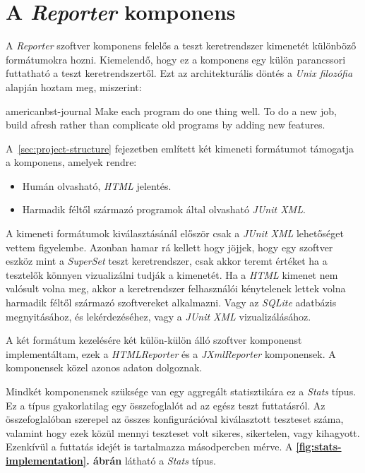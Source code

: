\section{A \textit{Reporter} komponens}\label{chp:reporter}

    A \textit{Reporter} szoftver komponens felelős a teszt keretrendszer kimenetét különböző formátumokra hozni.
    Kiemelendő, hogy ez a komponens egy külön parancssori futtatható a teszt keretrendszertől. Ezt az architekturális
    döntés a \emph{Unix filozófia} alapján hoztam meg, miszerint:

    \begin{foreigndisplaycquote}{american}{bst-journal}
        Make each program do one thing well. To do a new job, build afresh rather than complicate old programs by adding
        new features.
    \end{foreigndisplaycquote}

    A~\ref{sec:project-structure} fejezetben említett két kimeneti formátumot támogatja a komponens, amelyek rendre:

    \begin{itemize}
        \item Humán olvasható, \textit{HTML} jelentés.
        \item Harmadik féltől származó programok által olvasható \textit{JUnit XML}.
    \end{itemize}

    A kimeneti formátumok kiválasztásánál először csak a \textit{JUnit XML} lehetőséget vettem figyelembe. Azonban
    hamar rá kellett hogy jöjjek, hogy egy szoftver eszköz mint a \textit{SuperSet} teszt keretrendszer, csak akkor
    teremt értéket ha a tesztelők könnyen vizualizálni tudják a kimenetét. Ha a \textit{HTML} kimenet nem valósult
    volna meg, akkor a keretrendszer felhasználói kénytelenek lettek volna harmadik féltől származó szoftvereket
    alkalmazni. Vagy az \textit{SQLite} adatbázis megnyitásához, és lekérdezéséhez, vagy a \textit{JUnit XML}
    vizualizálásához.

    A két formátum kezelésére két külön-külön álló szoftver komponenst implementáltam, ezek a \textit{HTMLReporter} és
    a \textit{JXmlReporter} komponensek. A komponensek közel azonos adaton dolgoznak.

    Mindkét komponensnek szüksége van egy aggregált statisztikára ez a \textit{Stats} típus. Ez a típus gyakorlatilag
    egy összefoglalót ad az egész teszt futtatásról. Az összefoglalóban szerepel az összes konfigurációval kiválasztott
    teszteset száma, valamint hogy ezek közül mennyi teszteset volt sikeres, sikertelen, vagy kihagyott. Ezenkívül a
    futtatás idejét is tartalmazza másodpercben mérve. A \textbf{\ref{fig:stats-implementation}. ábrán} látható a
    \textit{Stats} típus.

